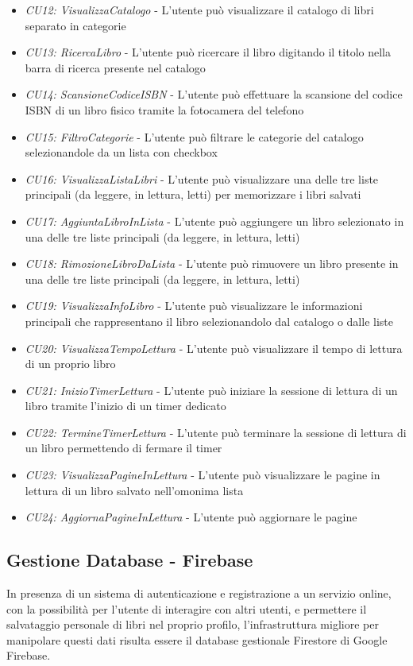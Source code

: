 \documentclass{article}
\begin{document}
\begin{itemize}[label=\textendash]
    \item \textit{CU12: VisualizzaCatalogo} - L'utente può visualizzare il catalogo di libri separato in categorie
    \item \textit{CU13: RicercaLibro} - L'utente può ricercare il libro digitando il titolo nella barra di ricerca presente nel catalogo
    \item \textit{CU14: ScansioneCodiceISBN} - L'utente può effettuare la scansione del codice ISBN di un libro fisico tramite la fotocamera del telefono
    \item \textit{CU15: FiltroCategorie} - L'utente può filtrare le categorie del catalogo selezionandole da un lista con checkbox
    \item \textit{CU16: VisualizzaListaLibri} - L'utente può visualizzare una delle tre liste principali (da leggere, in lettura, letti) per memorizzare i libri salvati
    \item \textit{CU17: AggiuntaLibroInLista} - L'utente può aggiungere un libro selezionato in una delle tre liste principali (da leggere, in lettura, letti)
    \item \textit{CU18: RimozioneLibroDaLista} - L'utente può rimuovere un libro presente in una delle tre liste principali (da leggere, in lettura, letti)
    \item \textit{CU19: VisualizzaInfoLibro} - L'utente può visualizzare le informazioni principali che rappresentano il libro selezionandolo dal catalogo o dalle liste
    \item \textit{CU20: VisualizzaTempoLettura} - L'utente può visualizzare il tempo di lettura di un proprio libro
    \item \textit{CU21: InizioTimerLettura} - L'utente può iniziare la sessione di lettura di un libro tramite l'inizio di un timer dedicato
    \item \textit{CU22: TermineTimerLettura} - L'utente può terminare la sessione di lettura di un libro permettendo di fermare il timer
    \item \textit{CU23: VisualizzaPagineInLettura} - L'utente può visualizzare le pagine in lettura di un libro salvato nell'omonima lista
    \item \textit{CU24: AggiornaPagineInLettura} - L'utente può aggiornare le pagine 
\end{itemize}

\subsection{Gestione Database - Firebase}
In presenza di un sistema di autenticazione e registrazione a un servizio online, con la possibilità per l'utente di interagire con altri utenti, e permettere il salvataggio personale di libri nel proprio profilo,
l'infrastruttura migliore per manipolare questi dati risulta essere il database gestionale Firestore di Google Firebase.
\end{document}
